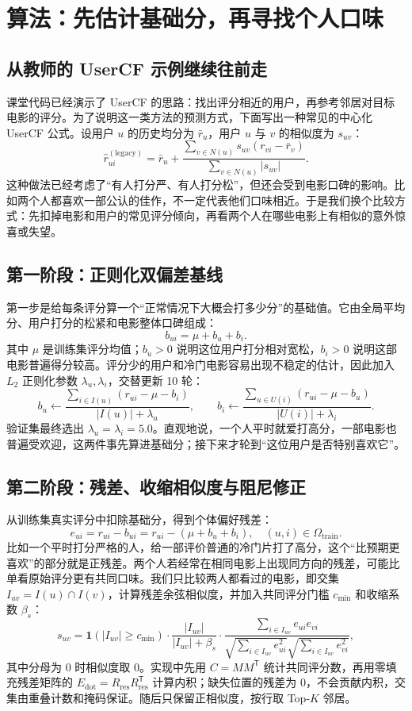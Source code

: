 \documentclass[10pt,a4paper]{article}
\begin{document}
\section{算法：先估计基础分，再寻找个人口味}
\subsection{从教师的 UserCF 示例继续往前走}
课堂代码已经演示了 UserCF 的思路：找出评分相近的用户，再参考邻居对目标电影的评分。为了说明这一类方法的预测方式，下面写出一种常见的中心化 UserCF 公式。设用户 $u$ 的历史均分为 $\bar r_u$，用户 $u$ 与 $v$ 的相似度为 $s_{uv}$：
\[
\hat r_{ui}^{(\mathrm{legacy})}
=\bar r_u+
\frac{\sum_{v\in N(u)}s_{uv}(r_{vi}-\bar r_v)}
{\sum_{v\in N(u)}|s_{uv}|}.
\]
这种做法已经考虑了“有人打分严、有人打分松”，但还会受到电影口碑的影响。比如两个人都喜欢一部公认的佳作，不一定代表他们口味相近。于是我们换个比较方式：先扣掉电影和用户的常见评分倾向，再看两个人在哪些电影上有相似的意外惊喜或失望。

\subsection{第一阶段：正则化双偏差基线}
第一步是给每条评分算一个“正常情况下大概会打多少分”的基础值。它由全局平均分、用户打分的松紧和电影整体口碑组成：
\[
b_{ui}=\mu+b_u+b_i.
\]
其中 $\mu$ 是训练集评分均值；$b_u>0$ 说明这位用户打分相对宽松，$b_i>0$ 说明这部电影普遍得分较高。评分少的用户和冷门电影容易出现不稳定的估计，因此加入 $L_2$ 正则化参数 $\lambda_u,\lambda_i$，交替更新 10 轮：
\[
b_u\leftarrow\frac{\sum_{i\in I(u)}(r_{ui}-\mu-b_i)}{|I(u)|+\lambda_u},
\qquad
b_i\leftarrow\frac{\sum_{u\in U(i)}(r_{ui}-\mu-b_u)}{|U(i)|+\lambda_i}.
\]
验证集最终选出 $\lambda_u=\lambda_i=5.0$。直观地说，一个人平时就爱打高分，一部电影也普遍受欢迎，这两件事先算进基础分；接下来才轮到“这位用户是否特别喜欢它”。

\subsection{第二阶段：残差、收缩相似度与阻尼修正}
从训练集真实评分中扣除基础分，得到个体偏好残差：
\[
e_{ui}=r_{ui}-b_{ui}=r_{ui}-(\mu+b_u+b_i),\quad (u,i)\in\Omega_{\mathrm{train}}.
\]
比如一个平时打分严格的人，给一部评价普通的冷门片打了高分，这个“比预期更喜欢”的部分就是正残差。两个人若经常在相同电影上出现同方向的残差，可能比单看原始评分更有共同口味。我们只比较两人都看过的电影，即交集 $I_{uv}=I(u)\cap I(v)$，计算残差余弦相似度，并加入共同评分门槛 $c_{\min}$ 和收缩系数 $\beta_s$：
\[
s_{uv}=\mathbf{1}(|I_{uv}|\ge c_{\min})
\cdot\frac{|I_{uv}|}{|I_{uv}|+\beta_s}
\cdot
\frac{\sum_{i\in I_{uv}}e_{ui}e_{vi}}
{\sqrt{\sum_{i\in I_{uv}}e_{ui}^{2}}\sqrt{\sum_{i\in I_{uv}}e_{vi}^{2}}},
\]
其中分母为 0 时相似度取 0。实现中先用 $C=MM^{\mathsf T}$ 统计共同评分数，再用零填充残差矩阵的 $E_{\mathrm{dot}}=R_{\mathrm{res}}R_{\mathrm{res}}^{\mathsf T}$ 计算内积；缺失位置的残差为 0，不会贡献内积，交集由重叠计数和掩码保证。随后只保留正相似度，按行取 Top-$K$ 邻居。
\end{document}
